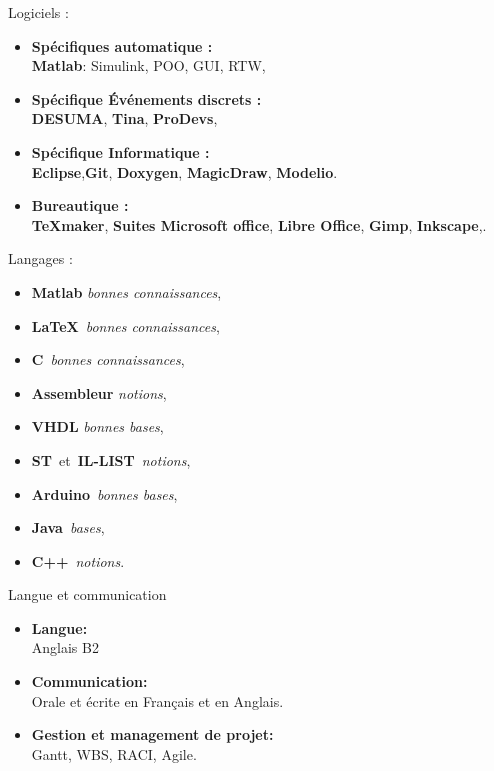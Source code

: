 \documentclass[11pt,a4paper,sans]{moderncv}        %
\newcommand{\myitem}{\textbullet}
\begin{document}
\vspace{8mm}
\tripleitemiseavecTitre%
{Logiciels :}%
{{%
	\begin{itemize}[label=\myitem]
		\item \textbf{Spécifiques automatique :}\\ \textbf{Matlab}: Simulink, POO, GUI, RTW, 
		\item \textbf{Spécifique Événements discrets :}\\ \textbf{DESUMA}, \textbf{Tina}, \textbf{ProDevs}, 
		\item \textbf{Spécifique Informatique :}\\ \textbf{Eclipse},\textbf{Git}, \textbf{Doxygen}, \textbf{MagicDraw}, \textbf{Modelio}.
		\item \textbf{Bureautique :} \\\textbf{\TeX maker}, \textbf{Suites Microsoft office}, \textbf{Libre Office}, \textbf{Gimp}, \textbf{Inkscape},.
	\end{itemize}
}}%
{Langages :}%
{%
	\begin{itemize}[label=\myitem]
		\item \textbf{Matlab} \textit{bonnes connaissances}, 
		\item \textbf{\LaTeX}~\textit{bonnes connaissances}, 
		\item \textbf{C}~\textit{bonnes connaissances},
		\item \textbf{Assembleur} \textit{notions}, 
		\item \textbf{VHDL} \textit{bonnes bases}, 
		\item \textbf{ST}~et~\textbf{IL-LIST}~\textit{notions}, 
		\item \textbf{Arduino}~\textit{bonnes bases}, 
		\item \textbf{Java}~\textit{bases}, 
		\item \textbf{C++}~\textit{notions}.%
	\end{itemize}
}%
{Langue et communication}%
{{%
	\begin{itemize}[label=\myitem]%
	\item \textbf{Langue: } \\ Anglais B2%
	\item \textbf{Communication: } \\ Orale et écrite en Français et en Anglais. %
	\item \textbf{Gestion et management de projet: } \\ Gantt, WBS, RACI, Agile.%
	\end{itemize}%
}}
\vspace{3cm}
\vspace{8mm}
\end{document}
